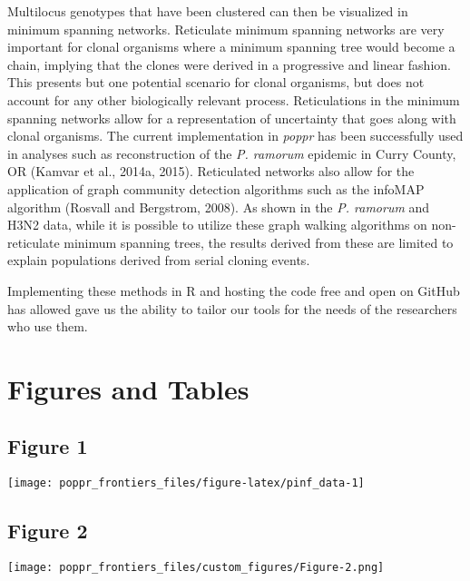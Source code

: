 \documentclass{frontiersSCNS} %
\newenvironment{CodeChunk}{}{}
\begin{document}
Multilocus genotypes that have been clustered can then be visualized in
minimum spanning networks. Reticulate minimum spanning networks are very
important for clonal organisms where a minimum spanning tree would
become a chain, implying that the clones were derived in a progressive
and linear fashion. This presents but one potential scenario for clonal
organisms, but does not account for any other biologically relevant
process. Reticulations in the minimum spanning networks allow for a
representation of uncertainty that goes along with clonal organisms. The
current implementation in \emph{poppr} has been successfully used in
analyses such as reconstruction of the \emph{P. ramorum} epidemic in
Curry County, OR (Kamvar et al., 2014a, 2015). Reticulated networks also
allow for the application of graph community detection algorithms such
as the infoMAP algorithm (Rosvall and Bergstrom, 2008). As shown in the
\emph{P. ramorum} and H3N2 data, while it is possible to utilize these
graph walking algorithms on non-reticulate minimum spanning trees, the
results derived from these are limited to explain populations derived
from serial cloning events.

Implementing these methods in R and hosting the code free and open on
GitHub has allowed gave us the ability to tailor our tools for the needs
of the researchers who use them.

\section*{Figures and Tables}\label{figures-and-tables}

\subsection*{Figure 1}\label{figure-1}

\begin{CodeChunk}

\texttt{[image: poppr\_frontiers\_files/figure-latex/pinf\_data-1]} \end{CodeChunk}

\subsection*{Figure 2}\label{figure-2}

\texttt{[image: poppr\_frontiers\_files/custom\_figures/Figure-2.png]}
\end{document}

